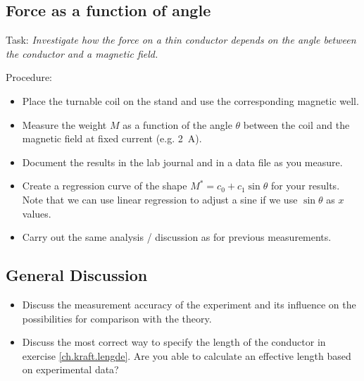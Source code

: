 \documentclass[../Elmag-labhefte-2020.tex]{subfiles}
\begin{document}

\subsection{Force as a function of angle}

Task:
\emph{Investigate how the force on a thin conductor depends on the angle between the conductor and a magnetic field.}

Procedure:
%
\begin{itemize}
    \item Place the turnable coil on the stand and use the corresponding magnetic well.
    \item Measure the weight $M$ as a function of the angle $\theta$ between the coil and the magnetic field at fixed current (e.g. \SI{2}{\ampere}).
    \item Document the results in the lab journal and in a data file as you measure. %
    \item Create a regression curve of the shape \(M ^{*} = c_0 + c_1 \sin \theta \) for your results. Note that we can use linear regression to adjust a sine if we use \(\sin \theta \) as \(x \) values.
    \item Carry out the same analysis / discussion as for previous measurements.
\end{itemize}

\subsection{General Discussion}
\begin{itemize}
    \item Discuss the measurement accuracy of the experiment and its influence on the possibilities for comparison with the theory.
    \item Discuss the most correct way to specify the length of the conductor in exercise \ref{ch.kraft.lengde}. Are you able to calculate an effective length based on experimental data?
\end{itemize}
\end{document}
